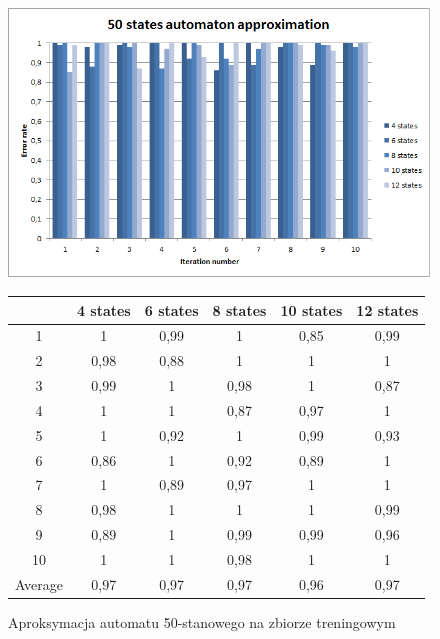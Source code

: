 \documentclass[runningheads,a4paper]{llncs}
\begin{document}
\begin{figure}[!htb]
\includegraphics[scale=0.92]{9.png}
\endminipage\hfill
\hspace{2.2cm}
\renewcommand{\arraystretch}{1.3}%
\begin{tabular}{@{}cccccc@{}}
\toprule
        & 4 states & 6 states & 8 states & 10 states & 12 states    \\ \midrule
1       & 1        & 0,99     & 1        & 0,85      & 0,99 \\
2       & 0,98     & 0,88     & 1        & 1         & 1 \\
3       & 0,99     & 1        & 0,98     & 1         & 0,87 \\
4       & 1        & 1        & 0,87     & 0,97      & 1   \\
5       & 1        & 0,92     & 1        & 0,99      & 0,93   \\
6       & 0,86     & 1        & 0,92     & 0,89      & 1    \\
7       & 1        & 0,89     & 0,97     & 1         & 1    \\
8       & 0,98     & 1        & 1        & 1         & 0,99    \\
9       & 0,89     & 1        & 0,99     & 0,99      & 0,96 \\
10      & 1        & 1        & 0,98     & 1         & 1  \\ \bottomrule
Average & 0,97    & 0,97     & 0,97    & 0,96     & 0,97  \\ \bottomrule
\end{tabular}
\vspace{4mm}
\endminipage\hfill
\caption{Aproksymacja automatu 50-stanowego na zbiorze treningowym}
\end{figure}
\end{document}
